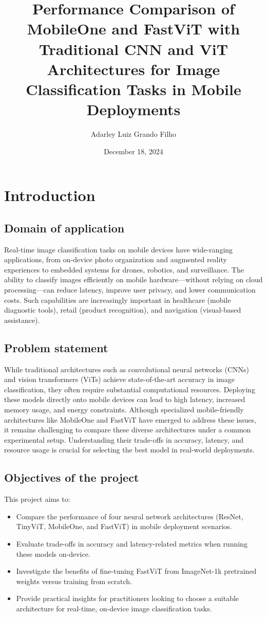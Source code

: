 \documentclass[12pt]{article}
\title{Performance Comparison of MobileOne and FastViT with Traditional CNN and ViT Architectures for Image Classification Tasks in Mobile Deployments}
\author{Adarley Luiz Grando Filho}
\date{December 18, 2024}
\begin{document}



\newpage

\tableofcontents
\newpage

\section{Introduction}

\subsection{Domain of application}
Real-time image classification tasks on mobile devices have wide-ranging applications, from on-device photo organization and augmented reality experiences to embedded systems for drones, robotics, and surveillance. The ability to classify images efficiently on mobile hardware—without relying on cloud processing—can reduce latency, improve user privacy, and lower communication costs. Such capabilities are increasingly important in healthcare (mobile diagnostic tools), retail (product recognition), and navigation (visual-based assistance).

\subsection{Problem statement}
While traditional architectures such as convolutional neural networks (CNNs) and vision transformers (ViTs) achieve state-of-the-art accuracy in image classification, they often require substantial computational resources. Deploying these models directly onto mobile devices can lead to high latency, increased memory usage, and energy constraints. Although specialized mobile-friendly architectures like MobileOne and FastViT have emerged to address these issues, it remains challenging to compare these diverse architectures under a common experimental setup. Understanding their trade-offs in accuracy, latency, and resource usage is crucial for selecting the best model in real-world deployments.

\subsection{Objectives of the project}
This project aims to:
\begin{itemize}
    \item Compare the performance of four neural network architectures (ResNet, TinyViT, MobileOne, and FastViT) in mobile deployment scenarios.
    \item Evaluate trade-offs in accuracy and latency-related metrics when running these models on-device.
    \item Investigate the benefits of fine-tuning FastViT from ImageNet-1k pretrained weights versus training from scratch.
    \item Provide practical insights for practitioners looking to choose a suitable architecture for real-time, on-device image classification tasks.
\end{itemize}
\end{document}
